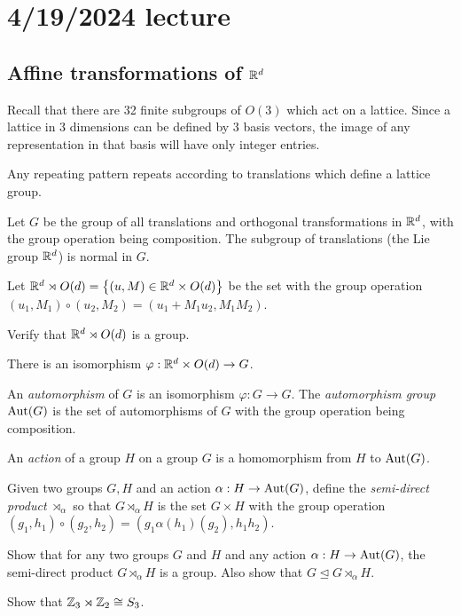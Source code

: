 \documentclass[class=article, crop=false]{standalone}
\begin{document}
\section{4/19/2024 lecture}

\subsection{Affine transformations of $\mathbb{R}^d$}

Recall that there are 32 finite subgroups of $O(3)$ which act on a lattice. Since a lattice in 3 dimensions can be defined by 3 basis vectors, the image of any representation in that basis will have only integer entries.
\par
\begin{note}
    Any repeating pattern repeats according to translations which define a lattice group.
\end{note}
Let $G$ be the group of all translations and orthogonal transformations in $\mathbb{R}^d$, with the group operation being composition. The subgroup of translations (the Lie group $\mathbb{R}^d$) is normal in $G$.
\par
Let $\mathbb{R}^d \rtimes O(d) = \left\{ (u, M) \in \mathbb{R}^d \times O(d) \right\}$ be the set with the group operation $(u_1, M_1) \circ (u_2, M_2) = (u_1 + M_1 u_2, M_1 M_2)$.
\begin{prob}
    Verify that $\mathbb{R}^d \rtimes O(d)$ is a group.
\end{prob}
\begin{prop}
    There is an isomorphism $\varphi: \mathbb{R}^d \times O(d) \rightarrow G$.
\end{prop}
An \emph{automorphism} of $G$ is an isomorphism $\varphi: G \rightarrow G$. The \emph{automorphism group} $\operatorname{Aut} (G)$ is the set of automorphisms of $G$ with the group operation being composition.
\par
An \emph{action} of a group $H$ on a group $G$ is a homomorphism from $H$ to $\operatorname{Aut}(G)$.
\par
Given two groups $G, H$ and an action $\alpha: H \rightarrow \operatorname{Aut} (G)$, define the \emph{semi-direct product} $\rtimes_\alpha$ so that $G \rtimes_\alpha H$ is the set $G \times H$ with the group operation $(g_1, h_1) \circ (g_2, h_2) = (g_1 \alpha(h_1)(g_2), h_1 h_2)$.
\begin{prob}
    Show that for any two groups $G$ and $H$ and any action $\alpha: H \rightarrow \operatorname{Aut}(G)$, the semi-direct product $G \rtimes_\alpha H$ is a group. Also show that $G \trianglelefteq G \rtimes_\alpha H$.
\end{prob}
\begin{prob}
    Show that $\mathbb{Z}_3 \rtimes \mathbb{Z}_2 \cong S_3$.
\end{prob}
\end{document}
